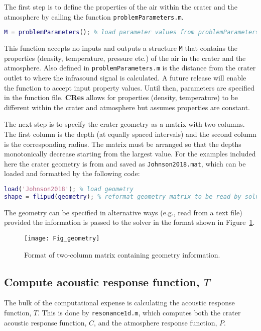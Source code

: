 \documentclass[10pt]{article}
\begin{document}
The first step is to define the properties of the air within the crater and the atmosphere by calling the function \texttt{problemParameters.m}. 
\begin{lstlisting}[language=Matlab]
M = problemParameters(); % load parameter values from problemParameters.m
\end{lstlisting}
This function accepts no inputs and outputs a structure \texttt{M} that contains the properties (density, temperature, pressure etc.) of the air in the crater and the atmosphere. Also defined in \texttt{problemParameters.m} is the distance from the crater outlet to where the infrasound signal is calculated. A future release will enable the function to accept input property values. Until then, parameters are specified in the function file. {\bf CRes} allows for properties (density, temperature) to be different within the crater and atmosphere but assumes properties are constant.

The next step is to specify the crater geometry as a matrix with two columns. The first column is the depth (at equally spaced intervals) and the second column is the corresponding radius. The matrix must be arranged so that the depths monotonically decrease starting from the largest value. For the examples included here the crater geometry is from \citet{Johnson2018} and saved as \texttt{Johnson2018.mat}, which can be loaded and formatted by the following code:
\begin{lstlisting}[language=Matlab]
load('Johnson2018'); % load geometry
shape = flipud(geometry); % reformat geometry matrix to be read by solver
\end{lstlisting}
The geometry can be specified in alternative ways (e.g., read from a text file) provided the information is passed to the solver in the format shown in Figure~\ref{fig:geometry}.

\begin{figure}[h!]
\centering
\texttt{[image: Fig\_geometry]}
\caption{Format of two-column matrix containing geometry information.}
\label{fig:geometry}
\end{figure}

\subsection{Compute acoustic response function, $T$}
The bulk of the computational expense is calculating the acoustic response function, $T$. This is done by \texttt{resonance1d.m}, which computes both the crater acoustic response function, $C$, and the atmosphere response function, $P$.
\end{document}
